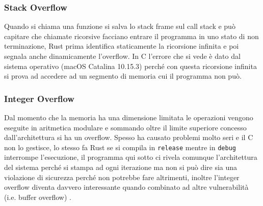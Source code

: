 \documentclass{article}
\begin{document}
\subsubsection{Stack Overflow}
Quando si chiama una funzione si salva lo stack frame sul call stack e può capitare che chiamate ricorsive facciano entrare il programma in uno stato di non terminazione, Rust prima identifica staticamente la ricorsione infinita e poi segnala anche dinamicamente l'overflow. In C l'errore che si vede è dato dal sistema operativo (macOS Catalina 10.15.3) perché con questa ricorsione infinita si prova ad accedere ad un segmento  di memoria cui il programma non può.







\subsubsection{Integer Overflow}
Dal momento che la memoria ha una dimensione limitata le operazioni vengono eseguite in aritmetica modulare e sommando oltre il limite superiore concesso dall'architettura si ha un overflow. Spesso ha causato problemi molto seri e il C non lo gestisce, lo stesso fa Rust se si compila in \texttt{release} mentre in \texttt{debug} interrompe l'esecuzione, il programma qui sotto ci rivela comunque l'architettura del sistema perché si stampa ad ogni iterazione ma non si può dire sia una violazione di sicurezza perché non potrebbe fare altrimenti, inoltre l'integer overflow diventa davvero interessante quando combinato ad altre vulnerabilità (i.e. buffer overflow) \cite[10.2.3]{gollmann:computersecurity}. 






\end{document}
